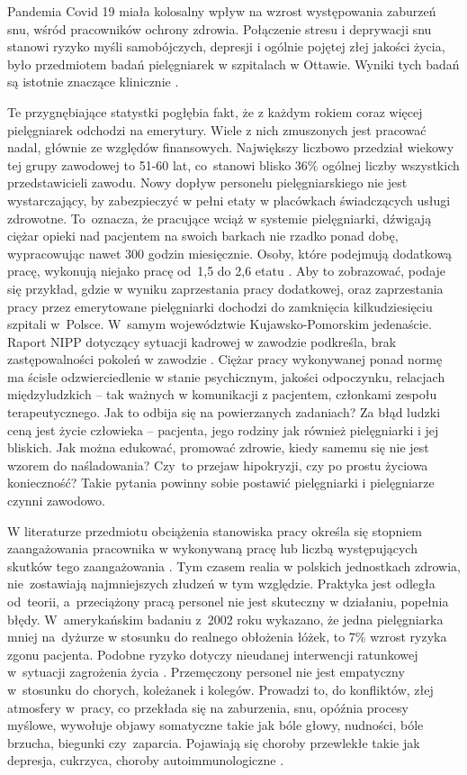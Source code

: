 \documentclass[a4paper,12pt,twoside,openright]{mwrep}
\begin{document}
Pandemia Covid 19 miała kolosalny wpływ na wzrost występowania zaburzeń snu, wśród pracowników ochrony zdrowia. Połączenie stresu i deprywacji snu stanowi ryzyko myśli samobójczych, depresji i ogólnie pojętej złej jakości życia, było przedmiotem badań pielęgniarek w szpitalach w Ottawie. Wyniki tych badań są istotnie znaczące klinicznie \cite{sen}.

Te przygnębiające statystki pogłębia fakt, że z każdym rokiem coraz więcej pielęgniarek odchodzi na emerytury. Wiele z nich zmuszonych jest pracować nadal, głównie ze względów finansowych.  Największy liczbowo przedział wiekowy tej grupy zawodowej to 51-60 lat, co~stanowi blisko 36\% ogólnej liczby wszystkich przedstawicieli zawodu. Nowy dopływ personelu pielęgniarskiego nie jest wystarczający, by zabezpieczyć w pełni etaty w placówkach świadczących usługi zdrowotne. To~oznacza, że pracujące wciąż w systemie pielęgniarki, dźwigają ciężar opieki nad pacjentem na swoich barkach nie rzadko ponad dobę, wypracowując nawet 300 godzin miesięcznie. Osoby, które podejmują dodatkową pracę, wykonują niejako pracę od~1,5 do 2,6 etatu \cite{cyfrowe}. Aby to zobrazować, podaje się przykład, gdzie w wyniku zaprzestania pracy dodatkowej, oraz zaprzestania pracy przez emerytowane pielęgniarki dochodzi do zamknięcia kilkudziesięciu szpitali w~Polsce. W~samym województwie Kujawsko-Pomorskim jedenaście. Raport NIPP dotyczący sytuacji kadrowej w zawodzie podkreśla, brak zastępowalności pokoleń w zawodzie \cite{statystyka}. Ciężar pracy wykonywanej ponad normę ma ścisłe odzwierciedlenie w  stanie psychicznym, jakości  odpoczynku, relacjach międzyludzkich – tak ważnych w komunikacji z pacjentem, członkami zespołu terapeutycznego. Jak to odbija się na powierzanych zadaniach? Za błąd ludzki ceną jest życie człowieka – pacjenta, jego rodziny jak również pielęgniarki i jej bliskich. Jak można edukować, promować zdrowie, kiedy samemu się nie jest wzorem do naśladowania? Czy~to przejaw hipokryzji, czy po prostu życiowa konieczność? Takie pytania powinny sobie postawić pielęgniarki i pielęgniarze czynni zawodowo.

W literaturze przedmiotu obciążenia stanowiska pracy określa się stopniem zaangażowania pracownika w wykonywaną pracę lub liczbą występujących skutków tego zaangażowania \cite{stanowisko}. Tym czasem realia w polskich jednostkach zdrowia, nie~zostawiają najmniejszych złudzeń w tym względzie. Praktyka jest odległa od~teorii, a~przeciążony pracą personel nie jest skuteczny w działaniu, popełnia błędy. W~amerykańskim badaniu z~2002 roku wykazano, że jedna pielęgniarka mniej na~dyżurze w stosunku do realnego obłożenia łóżek, to 7\% wzrost ryzyka zgonu pacjenta. Podobne ryzyko dotyczy nieudanej interwencji ratunkowej w~sytuacji zagrożenia życia \cite{rko}. Przemęczony personel nie jest empatyczny w~stosunku do chorych, koleżanek i kolegów. Prowadzi to, do konfliktów, złej atmosfery w~pracy, co przekłada się na zaburzenia, snu, opóźnia procesy myślowe, wywołuje objawy somatyczne takie jak bóle głowy, nudności, bóle brzucha, biegunki czy~zaparcia. Pojawiają się choroby przewlekłe takie jak depresja, cukrzyca, choroby autoimmunologiczne \cite{zdrowie}.
\end{document}

